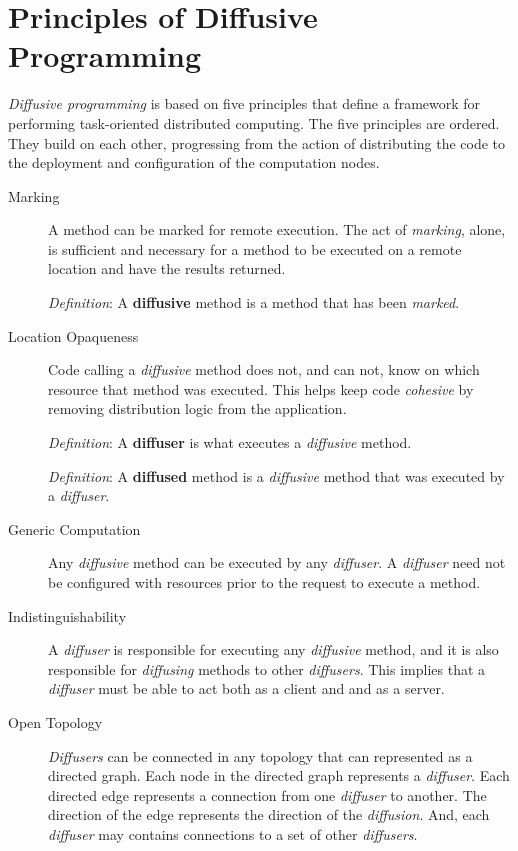 \documentclass[11pt]{article}
\begin{document}
%
%
\section{Principles of Diffusive Programming\label{sec:principles_of_diffusive_programming}}
\emph{Diffusive programming} is based on five principles that define a framework for performing task-oriented distributed computing. The five principles are ordered. They build on each other, progressing from the action of distributing the code to the deployment and configuration of the computation nodes.

\begin{description}

	\item[Marking] 
	A method can be marked for remote execution. The act of \emph{marking}, alone, is sufficient and necessary for a method to be executed on a remote location and have the results returned. 
	
	\emph{Definition}: A \textbf{diffusive} method is a method that has been \emph{marked}.

	\item[Location Opaqueness]
	Code calling a \emph{diffusive} method does not, and can not, know on which resource that method was executed. This helps keep code \emph{cohesive} by removing distribution logic from the application. 
	
	\emph{Definition}: A \textbf{diffuser} is what executes a \emph{diffusive} method.
	
	\emph{Definition}: A \textbf{diffused} method is a \emph{diffusive} method that was executed by a \emph{diffuser}. 
	
	\item[Generic Computation]
	Any \emph{diffusive} method can be executed by any \emph{diffuser}. A \emph{diffuser} need not be configured with resources prior to the request to execute a method.
	
	\item[Indistinguishability]
	A \emph{diffuser} is responsible for executing any \emph{diffusive} method, and it is also responsible for \emph{diffusing} methods to other \emph{diffusers}. This implies that a \emph{diffuser} must be able to act both as a client and and as a server.
	
	\item[Open Topology]
	\emph{Diffusers} can be connected in any topology that can represented as a directed graph. Each node in the directed graph represents a \emph{diffuser}. Each directed edge represents a connection from one \emph{diffuser} to another. The direction of the edge represents the direction of the \emph{diffusion}. And, each \emph{diffuser} may contains connections to a set of other \emph{diffusers}. 
	

\end{description}
\end{document}
